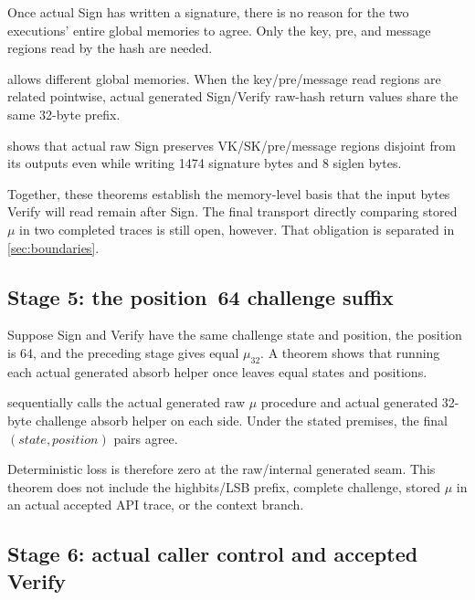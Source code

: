 Once actual Sign has written a signature, there is no reason for the two
executions' entire global memories to agree. Only the key, pre, and message
regions read by the hash are needed.

\begin{verified}
 allows different
global memories. When the key/pre/message read regions are related pointwise,
actual generated Sign/Verify raw-hash return values share the same 32-byte prefix.
\end{verified}

\begin{verified}
 shows that actual raw Sign
preserves VK/SK/pre/message regions disjoint from its outputs even while writing
1474 signature bytes and 8 siglen bytes.
\end{verified}

Together, these theorems establish the memory-level basis that the input bytes
Verify will read remain after Sign. The final transport directly comparing
stored \(\mu\) in two completed traces is still open, however.
That obligation is separated in \cref{sec:boundaries}.

\subsection{Stage 5: the position~64 challenge suffix}

Suppose Sign and Verify have the same challenge state and position, the
position is 64, and the preceding stage gives equal \(\mu_{32}\).
A theorem shows that running each actual generated absorb helper once leaves
equal states and positions.

\begin{verified}
 sequentially calls
the actual generated raw \(\mu\) procedure and actual generated 32-byte challenge
absorb helper on each side. Under the stated premises, the final
\((\mathit{state},\mathit{position})\) pairs agree.
\end{verified}

Deterministic loss is therefore zero at the raw/internal generated seam.
This theorem does not include the highbits/LSB prefix, complete challenge,
stored \(\mu\) in an actual accepted API trace, or the context branch.

\subsection{Stage 6: actual caller control and accepted Verify}

